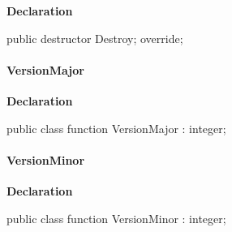 \documentclass{report}
\newif\ifpdf
\begin{document}
\label{RegExpr.TRegExpr-Destroy}
\begin{list}{}{
\setlength{\itemindent}{0cm}
\setlength{\listparindent}{0cm}
\setlength{\leftmargin}{\evensidemargin}
\addtolength{\leftmargin}{\tmplength}
\settowidth{\labelsep}{X}
\addtolength{\leftmargin}{\labelsep}
\setlength{\labelwidth}{\tmplength}
}
\item[\textbf{Declaration}\hfill]
\ifpdf
\begin{flushleft}
\fi
\begin{ttfamily}
public destructor Destroy; override;\end{ttfamily}

\ifpdf
\end{flushleft}
\fi

\end{list}
\paragraph*{VersionMajor}\hspace*{\fill}

\label{RegExpr.TRegExpr-VersionMajor}
\begin{list}{}{
\setlength{\itemindent}{0cm}
\setlength{\listparindent}{0cm}
\setlength{\leftmargin}{\evensidemargin}
\addtolength{\leftmargin}{\tmplength}
\settowidth{\labelsep}{X}
\addtolength{\leftmargin}{\labelsep}
\setlength{\labelwidth}{\tmplength}
}
\item[\textbf{Declaration}\hfill]
\ifpdf
\begin{flushleft}
\fi
\begin{ttfamily}
public class function VersionMajor : integer;\end{ttfamily}

\ifpdf
\end{flushleft}
\fi

\end{list}
\paragraph*{VersionMinor}\hspace*{\fill}

\label{RegExpr.TRegExpr-VersionMinor}
\begin{list}{}{
\setlength{\itemindent}{0cm}
\setlength{\listparindent}{0cm}
\setlength{\leftmargin}{\evensidemargin}
\addtolength{\leftmargin}{\tmplength}
\settowidth{\labelsep}{X}
\addtolength{\leftmargin}{\labelsep}
\setlength{\labelwidth}{\tmplength}
}
\item[\textbf{Declaration}\hfill]
\ifpdf
\begin{flushleft}
\fi
\begin{ttfamily}
public class function VersionMinor : integer;\end{ttfamily}

\ifpdf
\end{flushleft}
\fi

\end{list}
\end{document}
